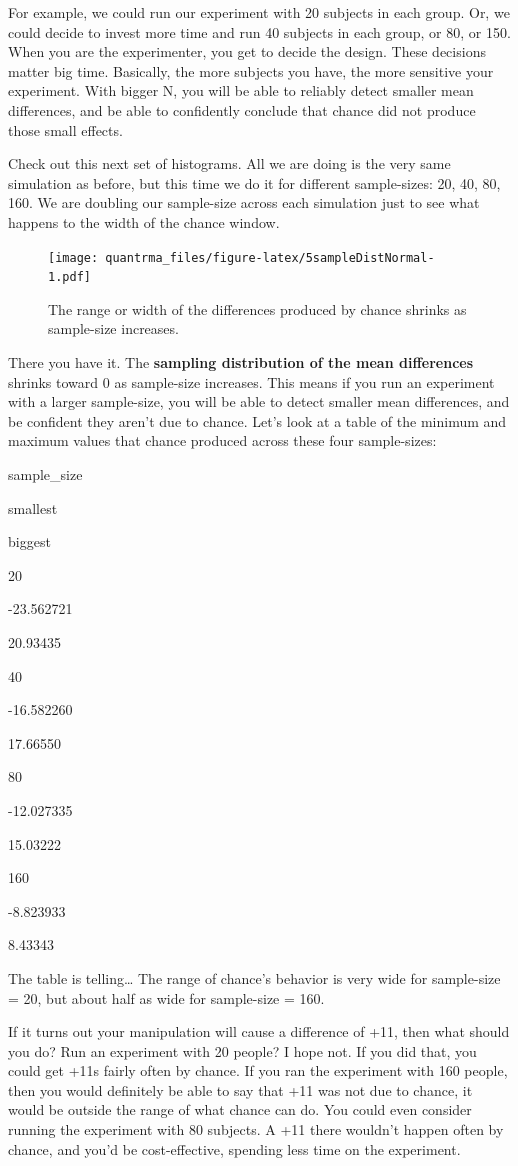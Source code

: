 \documentclass[
]{book}
\begin{document}
For example, we could run our experiment with 20 subjects in each group. Or, we could decide to invest more time and run 40 subjects in each group, or 80, or 150. When you are the experimenter, you get to decide the design. These decisions matter big time. Basically, the more subjects you have, the more sensitive your experiment. With bigger N, you will be able to reliably detect smaller mean differences, and be able to confidently conclude that chance did not produce those small effects.

Check out this next set of histograms. All we are doing is the very same simulation as before, but this time we do it for different sample-sizes: 20, 40, 80, 160. We are doubling our sample-size across each simulation just to see what happens to the width of the chance window.

\begin{figure}
\centering
\texttt{[image: quantrma\_files/figure-latex/5sampleDistNormal-1.pdf]}
\caption{\label{fig:5sampleDistNormal}The range or width of the differences produced by chance shrinks as sample-size increases.}
\end{figure}

There you have it. The \textbf{sampling distribution of the mean differences} shrinks toward 0 as sample-size increases. This means if you run an experiment with a larger sample-size, you will be able to detect smaller mean differences, and be confident they aren't due to chance. Let's look at a table of the minimum and maximum values that chance produced across these four sample-sizes:

sample\_size

smallest

biggest

20

-23.562721

20.93435

40

-16.582260

17.66550

80

-12.027335

15.03222

160

-8.823933

8.43343

The table is telling\ldots{} The range of chance's behavior is very wide for sample-size = 20, but about half as wide for sample-size = 160.

If it turns out your manipulation will cause a difference of +11, then what should you do? Run an experiment with 20 people? I hope not. If you did that, you could get +11s fairly often by chance. If you ran the experiment with 160 people, then you would definitely be able to say that +11 was not due to chance, it would be outside the range of what chance can do. You could even consider running the experiment with 80 subjects. A +11 there wouldn't happen often by chance, and you'd be cost-effective, spending less time on the experiment.
\end{document}
